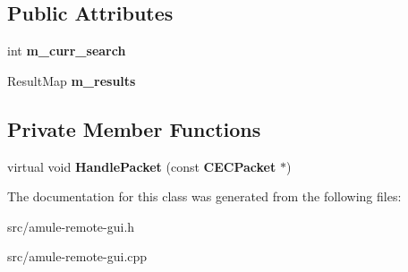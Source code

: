 \subsection*{Public Attributes}
\begin{DoxyCompactItemize}
\item 
int {\bfseries m\_\-curr\_\-search}\label{classCSearchListRem_aae7fc60ba5fbe284fae447ade49f2498}

\item 
ResultMap {\bfseries m\_\-results}\label{classCSearchListRem_ac2e875e02db3b6081181fc67eb2625e8}

\end{DoxyCompactItemize}
\subsection*{Private Member Functions}
\begin{DoxyCompactItemize}
\item 
virtual void {\bfseries HandlePacket} (const {\bf CECPacket} $\ast$)\label{classCSearchListRem_a4c3cf760a1b07e0a5707b3a61e99ce81}

\end{DoxyCompactItemize}


The documentation for this class was generated from the following files:\begin{DoxyCompactItemize}
\item 
src/amule-\/remote-\/gui.h\item 
src/amule-\/remote-\/gui.cpp\end{DoxyCompactItemize}
